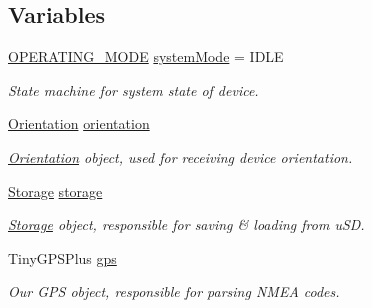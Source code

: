 \subsection*{Variables}
\begin{DoxyCompactItemize}
\item 
\mbox{\label{logging-device_8ino_a13a2ecbcf455940dd240e54e9e39cf7a}} 
\hyperlink{logging-device_8ino_a980e950615d86dadef54f3cfaefb5fb4}{O\+P\+E\+R\+A\+T\+I\+N\+G\+\_\+\+M\+O\+DE} \hyperlink{logging-device_8ino_a13a2ecbcf455940dd240e54e9e39cf7a}{system\+Mode} = I\+D\+LE
\begin{DoxyCompactList}\small\item\em State machine for system state of device. \end{DoxyCompactList}\item 
\mbox{\label{logging-device_8ino_a47be0262307aa023a1bda3d98986a16d}} 
\hyperlink{class_orientation}{Orientation} \hyperlink{logging-device_8ino_a47be0262307aa023a1bda3d98986a16d}{orientation}
\begin{DoxyCompactList}\small\item\em \hyperlink{class_orientation}{Orientation} object, used for receiving device orientation. \end{DoxyCompactList}\item 
\mbox{\label{logging-device_8ino_a40059244119c00baa1b841119cfd1b2e}} 
\hyperlink{class_storage}{Storage} \hyperlink{logging-device_8ino_a40059244119c00baa1b841119cfd1b2e}{storage}
\begin{DoxyCompactList}\small\item\em \hyperlink{class_storage}{Storage} object, responsible for saving \& loading from u\+SD. \end{DoxyCompactList}\item 
\mbox{\label{logging-device_8ino_a169c53997a7da1d0fb99aec1b4675ce8}} 
Tiny\+G\+P\+S\+Plus \hyperlink{logging-device_8ino_a169c53997a7da1d0fb99aec1b4675ce8}{gps}
\begin{DoxyCompactList}\small\item\em Our G\+PS object, responsible for parsing N\+M\+EA codes. \end{DoxyCompactList}\item 
\mbox{\label{logging-device_8ino_ae3799d2cbf8f13e21cbaef64b75c6833}} 

\end{DoxyCompactItemize}
